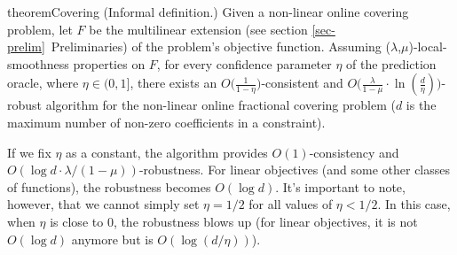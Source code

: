 \begin{restatable}{theorem}{Covering}
\label{thm:covering}
(Informal definition.) Given a non-linear online covering problem, let $F$ be the multilinear extension (see section \ref{sec-prelim}~Preliminaries) of the problem's objective function. Assuming ($\lambda$,$\mu$)-local-smoothness properties on $F$, for every confidence parameter $\eta$ of the prediction oracle, where $\eta \in (0,1]$, there exists an $O\bigl( \frac{1}{1 - \eta} \bigr)$-consistent and
$O\bigl( \frac{\lambda}{1 - \mu}  \cdot \ln \left(\frac{d}{\eta}\right) \bigr)$-robust algorithm for the non-linear online fractional covering problem ($d$ is the maximum number of non-zero coefficients in a constraint).
\end{restatable}

%

If we fix $\eta$ as a constant, the algorithm provides $O(1)$-consistency and $O(\log d \cdot \lambda/(1-\mu))$-robustness. For linear objectives (and some other classes of functions), the robustness becomes $O(\log d)$. It's important to note, however, that we cannot simply set $\eta = 1/2$ for all values of $\eta < 1/2$. In this case, when $\eta$ is close to $0$, the robustness blows up (for linear objectives, it is not $O(\log d)$ anymore but is $O(\log (d/\eta))$).

